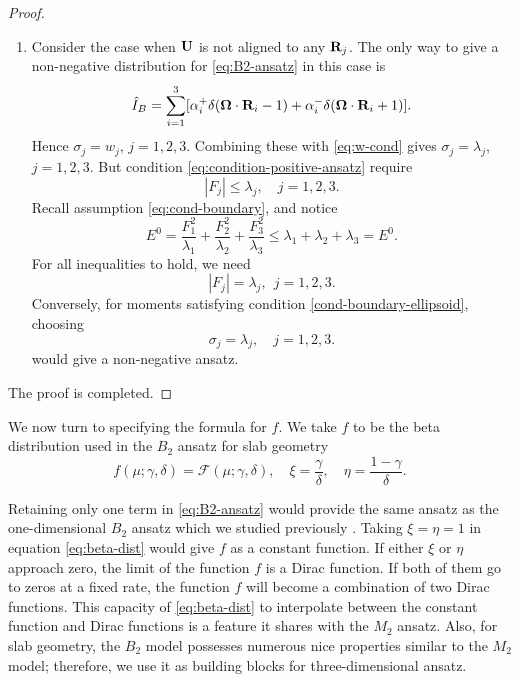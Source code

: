 \begin{proof}
\begin{enumerate}
    \item Consider the case when $\mathbf{U}$ is not aligned to any $\mathbf{R}_j$. 
      The only way to give a non-negative 
      distribution for \eqref{eq:B2-ansatz} in this case
      is
      \[
        \hat I_B = \sum\limits_{i = 1}^3 [ \alpha_i^+ \delta(\boldsymbol{\Omega} \cdot \mathbf{R}_i
        - 1) + \alpha_i^- \delta(\boldsymbol{\Omega} \cdot \mathbf{R}_i + 1) ].
      \]
      Hence $\sigma_j = w_j $, $j=1,2,3$. Combining these with \eqref{eq:w-cond}
      gives $\sigma_j = \lambda_j$, $j = 1,2,3$.
      But condition \eqref{eq:condition-positive-ansatz} 
      require
      \begin{equation}
        \left|F_j\right| \leq \lambda_j,\quad
        j = 1,2,3.
      \end{equation}
      Recall assumption \eqref{eq:cond-boundary}, and
      notice  
      \begin{equation}
        E^0 = \dfrac{F_1^2}{\lambda_1}
        +\dfrac{F_2^2}{\lambda_2}
        +\dfrac{F_3^2}{\lambda_3}
        \leq\lambda_1+\lambda_2+\lambda_3=E^0.
      \end{equation}
      For all inequalities to hold, we need 
      \begin{equation}\label{cond-boundary-ellipsoid}
        \left|F_j\right|=\lambda_j,~~j=1,2,3.
      \end{equation}
      Conversely, for moments satisfying condition \eqref{cond-boundary-ellipsoid}, 
      choosing 
      \begin{equation}
        \sigma_j = \lambda_j,\quad j = 1,2,3.
      \end{equation}
      would give a non-negative ansatz.
  \end{enumerate}
  The proof is completed.
\end{proof}

We now turn to specifying the formula for $f$. We take $f$
to be the beta distribution used in the $B_2$ ansatz for slab geometry
\begin{equation}\label{eq:beta-dist}
  f(\mu; \gamma, \delta) = \mathcal{F}(\mu; \gamma, \delta),
  \quad 
  \xi  = \frac\gamma\delta, \quad
  \eta = \frac{1 - \gamma}\delta.
\end{equation}

Retaining only one term in \eqref{eq:B2-ansatz} would provide the same 
ansatz as the one-dimensional $B_2$ ansatz which we studied previously 
\cite{alldredge2016approximating}. Taking $\xi = \eta = 1$ in equation
\eqref{eq:beta-dist} would give $f$ as a constant function. If either $\xi$
or $\eta$ approach zero, the limit of the function $f$ is a Dirac function. 
If both of them go to zeros at a fixed rate, the function $f$ will become 
a combination of two Dirac functions. This capacity of \eqref{eq:beta-dist}
to interpolate between the constant function and Dirac functions is a 
feature it shares with the $M_2$ ansatz. Also, for slab geometry, the $B_2$ 
model possesses numerous nice properties similar to the $M_2$ model;
therefore, we use it as building blocks for three-dimensional ansatz.

